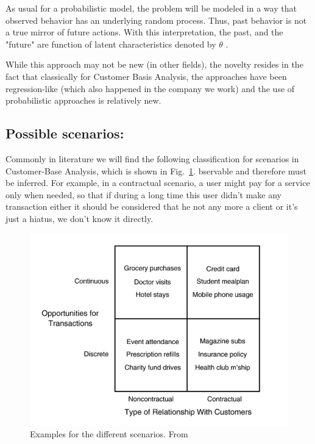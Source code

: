 \documentclass[paper=a4, fontsize=11pt]{scrartcl} %
\numberwithin{equation}{section} %
\numberwithin{figure}{section} %
\numberwithin{table}{section} %
\begin{document}
	As usual for a probabilistic model, the problem will be modeled in a way that observed behavior has an underlying random process. Thus, past behavior is not a true mirror of future actions. With this interpretation, the past, and the "future" are function of latent characteristics denoted by $\theta$ .
	
	While this approach may not be new (in other fields), the novelty resides in the fact that classically for Customer Basis Analysis, the approaches have been regression-like (which also happened in the company we work) and the use of probabilistic approaches is relatively new.
	
	\subsection{Possible scenarios:}
	
	Commonly in literature we will find the following classification for scenarios in Customer-Base Analysis, which is shown in Fig.~\ref{fig:Relation}.
bservable and therefore must be inferred. For example, in a contractual scenario, a user might pay for a service only when needed, so that if during a long time this user didn't make any transaction either it should be considered that he not any more a client or it's just a hiatus, we don't know it directly.
	
	\begin{figure}[h!]
		\centering
		\includegraphics[scale = 0.75]{CustomerRelation.png}
		\caption{Examples for the different scenarios. From \cite{feder09} }
		\label{fig:Relation}
	\end{figure}
	
\end{document}
